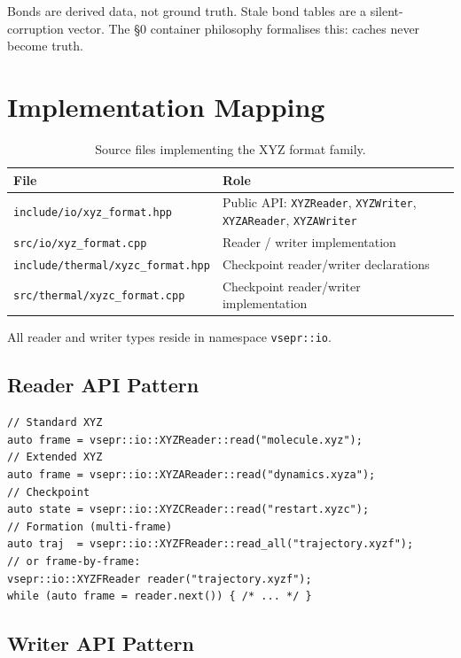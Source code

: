 \documentclass[12pt, a4paper, oneside]{article}
\newcommand{\file}[1]{\texttt{#1}}
\newcommand{\type}[1]{\texttt{#1}}
\begin{document}
Bonds are derived data, not ground truth.  Stale bond tables are a
silent-corruption vector.  The \S{}0 container philosophy formalises
this: caches never become truth.

\section{Implementation Mapping}
\label{sec:impl}

\begin{table}[htbp]
  \centering
  \caption{Source files implementing the XYZ format family.}
  \label{tab:impl}
  \begin{tabular}{lp{8.5cm}}
    \toprule
    File & Role \\
    \midrule
    \file{include/io/xyz\_format.hpp}
      & Public API: \type{XYZReader}, \type{XYZWriter},
        \type{XYZAReader}, \type{XYZAWriter} \\
    \file{src/io/xyz\_format.cpp}
      & Reader / writer implementation \\
    \file{include/thermal/xyzc\_format.hpp}
      & Checkpoint reader/writer declarations \\
    \file{src/thermal/xyzc\_format.cpp}
      & Checkpoint reader/writer implementation \\
    \bottomrule
  \end{tabular}
\end{table}

All reader and writer types reside in namespace \type{vsepr::io}.

\subsection{Reader API Pattern}

\begin{lstlisting}
// Standard XYZ
auto frame = vsepr::io::XYZReader::read("molecule.xyz");
// Extended XYZ
auto frame = vsepr::io::XYZAReader::read("dynamics.xyza");
// Checkpoint
auto state = vsepr::io::XYZCReader::read("restart.xyzc");
// Formation (multi-frame)
auto traj  = vsepr::io::XYZFReader::read_all("trajectory.xyzf");
// or frame-by-frame:
vsepr::io::XYZFReader reader("trajectory.xyzf");
while (auto frame = reader.next()) { /* ... */ }
\end{lstlisting}

\subsection{Writer API Pattern}
\end{document}
